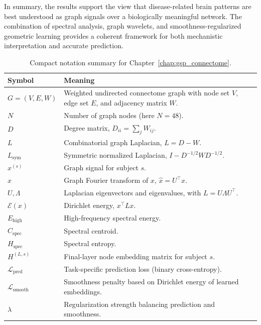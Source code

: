 In summary, the results support the view that disease-related brain patterns are best understood as graph signals over a biologically meaningful network. The combination of spectral analysis, graph wavelets, and smoothness-regularized geometric learning provides a coherent framework for both mechanistic interpretation and accurate prediction.

\FloatBarrier %

\begin{table}[H]
    \centering
    \caption{Compact notation summary for Chapter~\ref{chap:gsp_connectome}.}
    \label{tab:notation_ch4} %
    \begin{tabular}{p{2.6cm} p{11.8cm}}
        \toprule
        \textbf{Symbol} & \textbf{Meaning} \\
        \midrule
        \(G=(V,E,W)\) & Weighted undirected connectome graph with node set \(V\), edge set \(E\), and adjacency matrix \(W\). \\
        \(N\) & Number of graph nodes (here \(N=48\)). \\
        \(D\) & Degree matrix, \(D_{ii}=\sum_j W_{ij}\). \\
        \(L\) & Combinatorial graph Laplacian, \(L=D-W\). \\
        \(L_{\mathrm{sym}}\) & Symmetric normalized Laplacian, \(I-D^{-1/2}WD^{-1/2}\). \\
        \(x^{(s)}\) & Graph signal for subject \(s\). \\
        \(\hat x\) & Graph Fourier transform of \(x\), \(\hat x = U^\top x\). \\
        \(U,\Lambda\) & Laplacian eigenvectors and eigenvalues, with \(L=U\Lambda U^\top\). \\
        \(\mathcal{E}(x)\) & Dirichlet energy, \(x^\top L x\). \\
        \(E_{\mathrm{high}}\) & High-frequency spectral energy. \\
        \(C_{\mathrm{spec}}\) & Spectral centroid. \\
        \(H_{\mathrm{spec}}\) & Spectral entropy. \\
        \(H^{(L,s)}\) & Final-layer node embedding matrix for subject \(s\). \\
        \(\mathcal{L}_{\mathrm{pred}}\) & Task-specific prediction loss (binary cross-entropy). \\
        \(\mathcal{L}_{\mathrm{smooth}}\) & Smoothness penalty based on Dirichlet energy of learned embeddings. \\
        \(\lambda\) & Regularization strength balancing prediction and smoothness. \\
        \bottomrule
    \end{tabular}
\end{table}